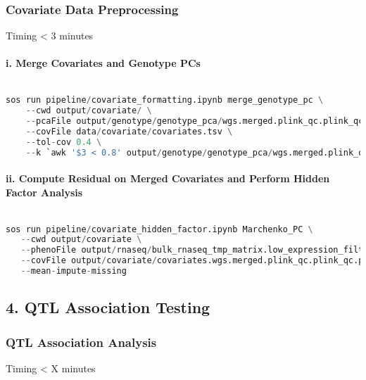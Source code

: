 \documentclass[12pt]{article}
\begin{document}
\subsubsection*{Covariate Data Preprocessing}
Timing < 3 minutes

\paragraph*{i. Merge Covariates and Genotype PCs}


\noindent
\begin{lstlisting}[language=Python]

sos run pipeline/covariate_formatting.ipynb merge_genotype_pc \
    --cwd output/covariate/ \
    --pcaFile output/genotype/genotype_pca/wgs.merged.plink_qc.plink_qc.prune.pca.rds \
    --covFile data/covariate/covariates.tsv \
    --tol-cov 0.4 \
    --k `awk '$3 < 0.8' output/genotype/genotype_pca/wgs.merged.plink_qc.plink_qc.prune.pca.scree.txt | tail -1 | cut -f 1 `

\end{lstlisting}




\paragraph*{ii. Compute Residual on Merged Covariates and Perform Hidden Factor Analysis}


\noindent
\begin{lstlisting}[language=Python]

sos run pipeline/covariate_hidden_factor.ipynb Marchenko_PC \
   --cwd output/covariate \
   --phenoFile output/rnaseq/bulk_rnaseq_tmp_matrix.low_expression_filtered.outlier_removed.tmm.expression.bed.bed.gz  \
   --covFile output/covariate/covariates.wgs.merged.plink_qc.plink_qc.prune.pca.gz \
   --mean-impute-missing

\end{lstlisting}




\subsection*{4. QTL Association Testing}


\subsubsection*{QTL Association Analysis}
Timing < X minutes
\end{document}
